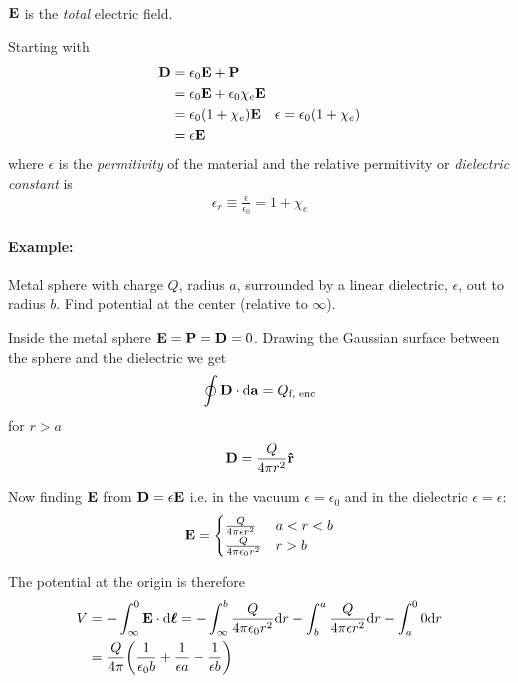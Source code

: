 \documentclass[../main.tex]{subfiles}
\begin{document}
\paragraph{}
$\vb E$ is the \textit{total} electric field.

Starting with
\begin{align*}
    \vb D &= \epsilon_0 \vb E + \vb P \\
    &= \epsilon_0 \vb E + \epsilon_0 \chi_e \vb E \\
    &= \epsilon_0 (1 + \chi_e) \vb E \quad \epsilon = \epsilon_0(1 + \chi_e) \\
    &= \epsilon \vb E
\end{align*}
where $\epsilon$ is the \textit{permitivity} of the material and the relative permitivity or \textit{dielectric constant} is
\begin{align*}
    \epsilon_r \equiv \frac{\epsilon}{\epsilon_0} = 1 + \chi_e
\end{align*}

\paragraph{Example:} Metal sphere with charge $Q$, radius $a$, surrounded by a linear dielectric,
$\epsilon$, out to radius $b$. Find potential at the center (relative to $\infty$).

Inside the metal sphere $\vb E = \vb P = \vb D = 0$.
Drawing the Gaussian surface between the sphere and the dielectric we get
\begin{align*}
    \oint \vb D \cdot \dd\vb a = Q_\text{f, enc}
\end{align*}
for $r > a$ 
\begin{align*}
    \vb D = \frac{Q}{4\pi r^2} \vu r
\end{align*}

Now finding $\vb E$ from $\vb D = \epsilon \vb E$ i.e. in the vacuum $\epsilon = \epsilon_0$ and in the dielectric $\epsilon = \epsilon$:
\begin{align*}
    \vb E = \begin{cases}
        \frac{Q}{4\pi \epsilon r^2} & a < r < b \\
        \frac{Q}{4\pi \epsilon_0 r^2} & r > b
    \end{cases}
\end{align*}

The potential at the origin is therefore
\begin{align*}
    V &= - \int_\infty^0 \vb E \cdot \dd\vb*\ell = - \int_\infty^b \frac{Q}{4\pi \epsilon_0 r^2} \dd r - \int_b^a \frac{Q}{4\pi \epsilon r^2} \dd r - \int_a^0  0 \dd r \\
    &= \frac{Q}{4\pi} \qt(
        \frac{1}{\epsilon_0 b} + \frac{1}{\epsilon a} - \frac{1}{\epsilon b}
    )
\end{align*}
\end{document}
